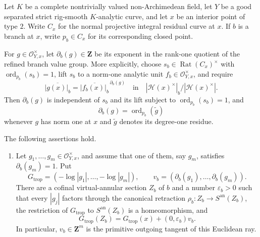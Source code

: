 \begin{proposition}
\label{prop:p21p3-gf-virtual-annulus-bridge}
Let \(K\) be a complete nontrivially valued non-Archimedean field, let
\(Y\) be a good separated strict rig-smooth \(K\)-analytic curve, and let \(x\) be an
interior point of type \(2\).  Write \(C_x\) for the normal projective
integral residual curve at \(x\).  If \(b\) is a branch at \(x\), write
\(p_b\in C_x\) for its corresponding closed point.

For \(g\in\mathcal O_{Y,x}^{\times}\), let
\(\partial_b(g)\in\mathbf Z\) be its exponent in the rank-one quotient of
the refined branch value group.  More explicitly, choose
\(s_b\in\operatorname{Rat}(C_x)^{\times}\) with
\(\operatorname{ord}_{p_b}(s_b)=1\), lift \(s_b\) to a norm-one analytic
unit \(f_b\in\mathcal O_{Y,x}^{\times}\), and require
\begin{equation}
\label{eq:p21p3-gf-branch-order-definition}
 \overline{|g(x)|_b}
 =\overline{|f_b(x)|_b}^{\,\partial_b(g)}
 \quad\text{in}\quad
 |\mathcal H(x)^{\times}|_b/|\mathcal H(x)^{\times}|.
\end{equation}
Then \(\partial_b(g)\) is independent of \(s_b\) and its lift subject to
\(\operatorname{ord}_{p_b}(s_b)=1\), and
\begin{equation}
\label{eq:p21p3-gf-branch-order-residue}
 \partial_b(g)=\operatorname{ord}_{p_b}(\widetilde g)
\end{equation}
whenever \(g\) has norm one at \(x\) and \(\widetilde g\) denotes its
degree-one residue.

The following assertions hold.
\begin{enumerate}
\item\label{itm:p21p3-gf-bridge:ray}
Let \(g_1,\ldots,g_m\in\mathcal O_{Y,x}^{\times}\), and assume that one
of them, say \(g_m\), satisfies \(\partial_b(g_m)=1\).  Put
\[
 G_{\mathrm{trop}}
   =(-\log|g_1|,\ldots,-\log|g_m|),
 \qquad
 v_b=(\partial_b(g_1),\ldots,\partial_b(g_m)).
\]
There are a cofinal virtual-annular section \(Z_b\) of \(b\) and a number
\(\varepsilon_b>0\) such that every \(|g_j|\) factors through the canonical
retraction \(\rho_b:Z_b\to S^{\mathrm{an}}(Z_b)\), the restriction of
\(G_{\mathrm{trop}}\) to \(S^{\mathrm{an}}(Z_b)\) is a homeomorphism, and
\begin{equation}
\label{eq:p21p3-gf-exact-branch-ray}
 G_{\mathrm{trop}}(Z_b)
 =G_{\mathrm{trop}}(x)+(0,\varepsilon_b)v_b.
\end{equation}
In particular, \(v_b\in\mathbf Z^m\) is the primitive outgoing tangent of
this Euclidean ray.


\end{enumerate}
\end{proposition}
